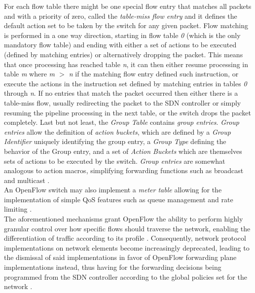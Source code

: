 %
For each flow table there might be one special flow entry that matches all packets and with a priority of zero, called the \emph{table-miss flow entry} and it defines the default action set to be taken by the switch for any given packet.
Flow matching is performed in a one way direction, starting in flow table \emph{0} (which is the only mandatory flow table) and ending with either a set of actions to be executed (defined by matching entries) or alternatively dropping the packet.
This means that once processing has reached table \emph{n}, it can then either resume processing in table \emph{m} where \emph{m $>$ n} if the matching flow entry defined such instruction, or execute the actions in the instruction set defined by matching entries in tables \emph{0} through \emph{n}.
If no entries that match the packet occurred then either there is a table-miss flow, usually redirecting the packet to the \gls{SDN} controller or simply resuming the pipeline processing in the next table, or the switch drops the packet completely.
%
Last but not least, the \emph{Group Table} contains \emph{group entries}.
\emph{Group entries} allow the definition of \emph{action buckets}, which are defined by a \emph{Group Identifier} uniquely identifying the group entry, a \emph{Group Type} defining the behavior of the Group entry, and a set of \emph{Action Buckets} which are themselves sets of actions to be executed by the switch.
\emph{Group entries} are somewhat analogous to action macros, simplifying forwarding functions such as broadcast and multicast \cite{OF13}.\\
%
An OpenFlow switch may also implement a \emph{meter table} allowing for the implementation of simple \gls{QoS} features such as queue management and rate limiting \cite{OF13}.\\
The aforementioned mechanisms grant OpenFlow the ability to perform highly granular control over how specific flows should traverse the network, enabling the differentiation of traffic according to its profile \cite{OFWP}.
Consequently, network protocol implementations on network elements become increasingly deprecated, leading to the dismissal of said implementations in favor of OpenFlow forwarding plane implementations instead, thus having for the forwarding decisions being programmed from the \gls{SDN} controller according to the global policies set for the network \cite{OFWP}.\\
%
